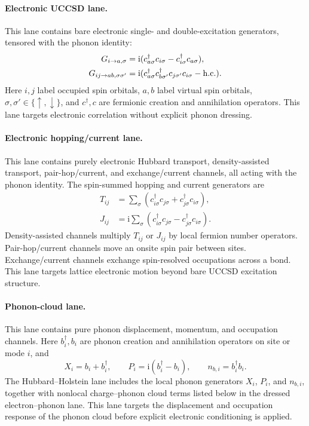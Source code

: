 \documentclass[
  reprint,
  amsmath,
  amssymb,
  aps,
  pra,
  nofootinbib,
  superscriptaddress,
  floatfix
]{revtex4-2}
\newcommand{\ii}{\mathrm{i}}
\begin{document}
\paragraph*{Electronic UCCSD lane.}
This lane contains bare electronic single- and double-excitation generators,
tensored with the phonon identity:
\begin{align*}
G_{i\to a,\sigma}
&=
\ii(c_{a\sigma}^{\dagger}c_{i\sigma}
-c_{i\sigma}^{\dagger}c_{a\sigma}),\\
G_{ij\to ab,\sigma\sigma'}
&=
\ii(c_{a\sigma}^{\dagger}c_{b\sigma'}^{\dagger}
c_{j\sigma'}c_{i\sigma}
-{\rm h.c.}) .
\end{align*}
Here \(i,j\) label occupied spin orbitals, \(a,b\) label virtual spin orbitals,
\(\sigma,\sigma'\in\{\uparrow,\downarrow\}\), and \(c^\dagger,c\) are
fermionic creation and annihilation operators. This lane targets electronic
correlation without explicit phonon dressing.

\paragraph*{Electronic hopping/current lane.}
This lane contains purely electronic Hubbard transport, density-assisted
transport, pair-hop/current, and exchange/current channels, all acting with the
phonon identity. The spin-summed hopping and current generators are
\begin{align*}
T_{ij}
&=
\sum_{\sigma}
(c_{i\sigma}^{\dagger}c_{j\sigma}
+c_{j\sigma}^{\dagger}c_{i\sigma}),\\
J_{ij}
&=
\ii\sum_{\sigma}
(c_{i\sigma}^{\dagger}c_{j\sigma}
-c_{j\sigma}^{\dagger}c_{i\sigma}) .
\end{align*}
Density-assisted channels multiply \(T_{ij}\) or \(J_{ij}\) by local fermion
number operators. Pair-hop/current channels move an onsite spin pair between
sites. Exchange/current channels exchange spin-resolved occupations across a
bond. This lane targets lattice electronic motion beyond bare UCCSD excitation
structure.

\paragraph*{Phonon-cloud lane.}
This lane contains pure phonon displacement, momentum, and occupation channels.
Here \(b_i^\dagger,b_i\) are phonon creation and annihilation
operators on site or mode \(i\), and
\[
X_i=b_i+b_i^\dagger,
\qquad
P_i=\ii(b_i^\dagger-b_i),
\qquad
n_{b,i}=b_i^\dagger b_i .
\]
The Hubbard--Holstein lane includes the local phonon generators \(X_i\),
\(P_i\), and \(n_{b,i}\), together with nonlocal charge--phonon cloud terms
listed below in the dressed electron--phonon lane. This lane targets the
displacement and occupation response of the phonon cloud before explicit
electronic conditioning is applied.
\end{document}
